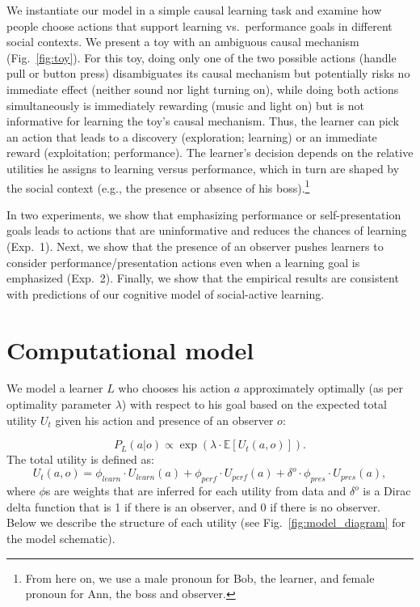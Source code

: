 \documentclass[10pt, letterpaper]{article}
\begin{document}
We instantiate our model in a simple causal learning task and examine
how people choose actions that support learning vs.~performance goals in
different social contexts. We present a toy with an ambiguous causal
mechanism (Fig.~\ref{fig:toy}). For this toy, doing only one of the two
possible actions (handle pull or button press) disambiguates its causal
mechanism but potentially risks no immediate effect (neither sound nor
light turning on), while doing both actions simultaneously is
immediately rewarding (music and light on) but is not informative for
learning the toy's causal mechanism. Thus, the learner can pick an
action that leads to a discovery (exploration; learning) or an immediate
reward (exploitation; performance). The learner's decision depends on
the relative utilities he assigns to learning versus performance, which
in turn are shaped by the social context (e.g., the presence or absence
of his
boss).\footnote{From here on, we use a male pronoun for Bob, the learner, and female pronoun for Ann, the boss and observer.}

In two experiments, we show that emphasizing performance or
self-presentation goals leads to actions that are uninformative and
reduces the chances of learning (Exp.~1). Next, we show that the
presence of an observer pushes learners to consider
performance/presentation actions even when a learning goal is emphasized
(Exp.~2). Finally, we show that the empirical results are consistent
with predictions of our cognitive model of social-active learning.

\section{Computational model}\label{computational-model}

We model a learner \(L\) who chooses his action \(a\) approximately
optimally (as per optimality parameter \(\lambda\)) with respect to his
goal based on the expected total utility \(U_{t}\) given his action and
presence of an observer \(o\):

\[ P_L(a | o) \propto \exp(\lambda \cdot \mathbb{E}[U_{t}(a,o)]).\]
\noindent
The total utility is defined as:
\[U_{t}(a,o) = \phi_{learn} \cdot U_{learn}(a) + \phi_{perf} \cdot U_{perf}(a) + \delta^o \cdot \phi_{pres} \cdot U_{pres}(a),\]
\noindent
where \(\phi\)s are weights that are inferred for each utility from data
and \(\delta^o\) is a Dirac delta function that is 1 if there is an
observer, and 0 if there is no observer. Below we describe the structure
of each utility (see Fig.~\ref{fig:model_diagram} for the model
schematic).
\end{document}

